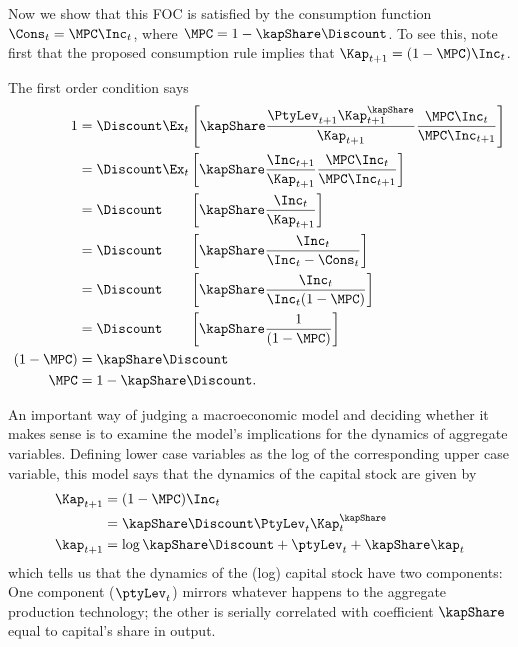 Now we show that this FOC is satisfied by the consumption function $\Cons_{t} =
\MPC \Inc_{t}$, where $\MPC = 1-\kapShare \Discount$.  To see this, note
first that the proposed consumption rule implies that $\Kap_{t+1} =
(1-\MPC) \Inc_{t}$.

The first order condition says
\begin{equation*}\begin{gathered}\begin{aligned}
1  & =  \Discount \Ex_{t} \left[\kapShare \frac{\PtyLev_{t+1} \Kap_{t+1}^{\kapShare}}{\Kap_{t+1}}\frac{\MPC \Inc_{t}}{\MPC \Inc_{t+1}}\right]
\\  & =  \Discount \Ex_{t} \left[\kapShare \frac{\Inc_{t+1}}{\Kap_{t+1}}\frac{\MPC \Inc_{t}}{\MPC \Inc_{t+1}}\right]
\\ & =  \Discount \phantom{\Ex_{t}} \left[\kapShare \frac{\Inc_{t}}{\Kap_{t+1}}\right]
\\ & =  \Discount \phantom{\Ex_{t}} \left[\kapShare \frac{\Inc_{t}}{\Inc_{t}-\Cons_{t}}\right]
\\ & =  \Discount \phantom{\Ex_{t}} \left[\kapShare \frac{\Inc_{t}}{\Inc_{t}(1-\MPC)}\right]
\\ & =  \Discount \phantom{\Ex_{t}} \left[\kapShare \frac{1}{(1-\MPC)}\right]
\\ (1-\MPC) & =  \kapShare \Discount
\\ \MPC     & =  1-\kapShare \Discount.
\end{aligned}\end{gathered}\end{equation*}

An important way of judging a macroeconomic
model and deciding whether it makes sense is to examine the model's
implications for the dynamics of aggregate variables.  Defining lower
case variables as the log of the corresponding upper case variable,
this model says that the dynamics of the capital stock are given by
\begin{equation}\begin{gathered}\begin{aligned}
   \Kap_{t+1} & =  (1-\MPC) \Inc_{t}
\\ & =  \kapShare\Discount \PtyLev_{t}\Kap_{t}^{\kapShare}
\\ \kap_{t+1} & =  \log \kapShare\Discount + \ptyLev_{t} + \kapShare \kap_{t} \label{eq:kDyn}
\end{aligned}\end{gathered}\end{equation}
which tells us that the dynamics of the (log) capital stock have two
components: One component ($\ptyLev_{t}$) mirrors whatever happens
to the aggregate production technology; the other
is serially correlated with coefficient $\kapShare$ equal
to capital's share in output.

